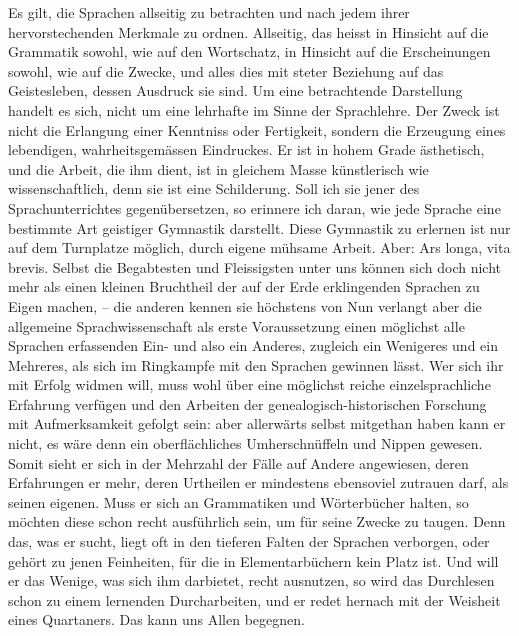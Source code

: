 Es gilt, die Sprachen allseitig zu betrachten und nach jedem ihrer hervorstechenden Merkmale zu ordnen. Allseitig, das heisst in Hinsicht \label{fp.458} auf die Grammatik sowohl, wie auf den Wortschatz, in Hinsicht auf die Erscheinungen sowohl, wie auf die Zwecke, und alles dies mit steter Beziehung auf das Geistesleben, dessen Ausdruck sie sind. Um eine betrachtende Darstellung handelt es sich, nicht um eine lehrhafte im Sinne der Sprachlehre. Der Zweck ist nicht die Erlangung einer Kenntniss oder Fertigkeit, sondern die Erzeugung eines lebendigen, wahrheitsgemässen Eindruckes. Er ist in hohem Grade ästhetisch, und die Arbeit, die ihm dient, ist in gleichem Masse künstlerisch wie wissenschaftlich, denn sie ist eine Schilderung. Soll ich sie jener des Sprachunterrichtes gegenübersetzen, so erinnere ich daran, wie jede Sprache eine bestimmte Art geistiger Gymnastik darstellt. Diese Gymnastik zu erlernen ist nur auf dem Turnplatze möglich, durch eigene mühsame Arbeit. Aber: Ars longa, vita brevis. Selbst die Begabtesten und Fleissigsten unter uns können sich doch nicht mehr als einen kleinen Bruchtheil der auf der Erde erklingenden Sprachen zu Eigen machen, – die anderen kennen sie höchstens von   Nun verlangt aber die allgemeine Sprachwissenschaft als erste Voraussetzung einen möglichst alle Sprachen erfassenden Ein- und  also ein Anderes, zugleich ein Wenigeres und ein Mehreres, als sich im Ringkampfe mit den Sprachen gewinnen lässt. Wer sich ihr mit Erfolg widmen will, muss wohl über eine möglichst reiche einzelsprachliche Erfahrung verfügen und den Arbeiten der genealogisch-historischen Forschung mit Aufmerksamkeit gefolgt sein: aber allerwärts selbst mitgethan haben kann er nicht, es wäre denn ein oberflächliches Umherschnüffeln und Nippen gewesen. Somit sieht er sich in der Mehrzahl der Fälle auf Andere angewiesen, deren Erfahrungen er mehr, deren Urtheilen er mindestens ebensoviel zutrauen darf, als seinen eigenen. \label{sp.478} Muss er sich an Grammatiken und Wörterbücher halten, so möchten diese schon recht ausführlich sein, um für seine Zwecke zu taugen. Denn das, was er sucht, liegt oft in den tieferen Falten der Sprachen verborgen, oder gehört zu jenen Feinheiten, für die in Elementarbüchern kein Platz ist. Und will er das Wenige, was sich ihm darbietet, recht ausnutzen, so wird das Durchlesen schon zu einem lernenden Durcharbeiten, und er redet hernach mit der Weisheit eines Quartaners. Das kann uns Allen begegnen. 

